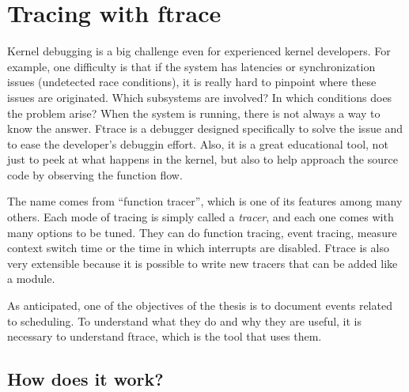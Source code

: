 \chapter{Tracing with ftrace}
\label{chap:ftrace}
Kernel debugging is a big challenge even for experienced kernel developers. For example, one difficulty is that if the system has latencies or synchronization issues (undetected race conditions), it is really hard to pinpoint where these issues are originated. Which subsystems are involved? In which conditions does the problem arise? When the system is running, there is not always  a way to know the answer. Ftrace is a debugger designed specifically to solve the issue and to ease the developer's debuggin effort. Also, it is a great educational tool, not just to peek at what happens in the kernel, but also to help approach the source code by observing the function flow.

The name comes from ``function tracer'', which is one of its features among many others. Each mode of tracing is simply called a \textit{tracer}, and each one comes with many options to be tuned. They can do function tracing, event tracing, measure context switch time or the time in which interrupts are disabled. Ftrace is also very extensible because it is possible to write new tracers that can be added like a module.

As anticipated, one of the objectives of the thesis is to document events related to scheduling. To understand what they do and why they are useful, it is necessary to understand ftrace, which is the tool that uses them.


\section{How does it work?}
\label{sec:how_does_it_work}

